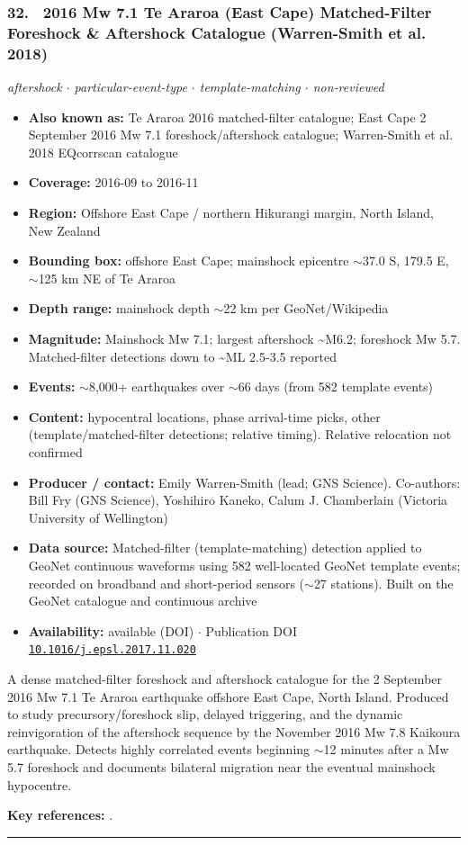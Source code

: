 \documentclass[10pt,a4paper]{article}
\newcommand{\catentryrule}{\par\vspace{3pt}\noindent\textcolor{rulegrey}{\rule{\linewidth}{0.3pt}}\par\vspace{5pt}}
\newcommand{\kv}[2]{\item \textbf{#1:} #2}
\begin{document}
\subsubsection*{\hypertarget{c:32}{32.}~ 2016 Mw 7.1 Te Araroa (East Cape) Matched-Filter Foreshock \& Aftershock Catalogue (Warren-Smith et al. 2018)}
{\small\itshape aftershock $\cdot$ particular-event-type $\cdot$ template-matching $\cdot$ non-reviewed}\par\vspace{2pt}
\begin{itemize}[leftmargin=1.3em,itemsep=0.6pt,topsep=1pt,parsep=0pt]
\kv{Also known as}{Te Araroa 2016 matched-filter catalogue; East Cape 2 September 2016 Mw 7.1 foreshock/aftershock catalogue; Warren-Smith et al. 2018 EQcorrscan catalogue}
\kv{Coverage}{2016-09 to 2016-11}
\kv{Region}{Offshore East Cape / northern Hikurangi margin, North Island, New Zealand}
\kv{Bounding box}{offshore East Cape; mainshock epicentre $\sim$37.0 S, 179.5 E, $\sim$125 km NE of Te Araroa}
\kv{Depth range}{mainshock depth $\sim$22 km per GeoNet/Wikipedia}
\kv{Magnitude}{Mainshock Mw 7.1; largest aftershock \textasciitilde{}M6.2; foreshock Mw 5.7. Matched-filter detections down to \textasciitilde{}ML 2.5-3.5 reported}
\kv{Events}{$\sim$8,000+ earthquakes over $\sim$66 days (from 582 template events)}
\kv{Content}{hypocentral locations, phase arrival-time picks, other (template/matched-filter detections; relative timing). Relative relocation not confirmed}
\kv{Producer / contact}{Emily Warren-Smith (lead; GNS Science). Co-authors: Bill Fry (GNS Science), Yoshihiro Kaneko, Calum J. Chamberlain (Victoria University of Wellington)}
\kv{Data source}{Matched-filter (template-matching) detection applied to GeoNet continuous waveforms using 582 well-located GeoNet template events; recorded on broadband and short-period sensors ($\sim$27 stations). Built on the GeoNet catalogue and continuous archive}
\kv{Availability}{available (DOI) $\cdot$ Publication DOI \href{https://doi.org/10.1016/j.epsl.2017.11.020}{\nolinkurl{10.1016/j.epsl.2017.11.020}}}
\end{itemize}
\par\vspace{2pt}A dense matched-filter foreshock and aftershock catalogue for the 2 September 2016 Mw 7.1 Te Araroa earthquake offshore East Cape, North Island. Produced to study precursory/foreshock slip, delayed triggering, and the dynamic reinvigoration of the aftershock sequence by the November 2016 Mw 7.8 Kaikoura earthquake. Detects highly correlated events beginning $\sim$12 minutes after a Mw 5.7 foreshock and documents bilateral migration near the eventual mainshock hypocentre.
\par\vspace{2pt}\textbf{Key references:} \cite{WarrenSmith2018}.
\catentryrule
\end{document}
